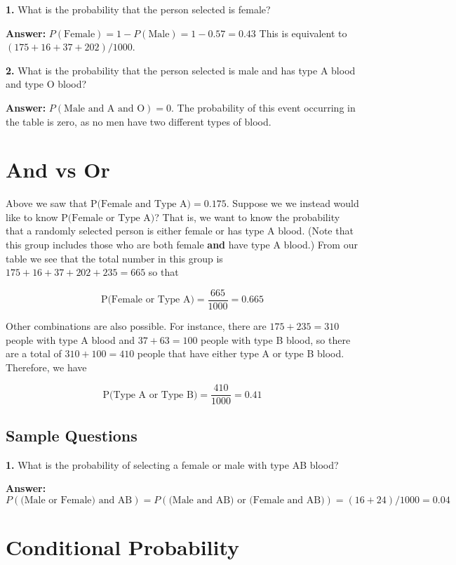 \documentclass[
]{book}
\begin{document}
\textbf{1.} What is the probability that the person selected is female?

\textbf{Answer:} \(P(\text{Female}) = 1 - P(\text{Male}) = 1 - 0.57 = 0.43\) This is equivalent to \((175 + 16 + 37 + 202) / 1000\).

\textbf{2.} What is the probability that the person selected is male and has type A blood and type O blood?

\textbf{Answer:} \(P(\text{Male and A and O}) = 0\). The probability of this event occurring in the table is zero, as no men have two different types of blood.

\hypertarget{and-vs-or}{%
\section{And vs Or}\label{and-vs-or}}

Above we saw that \(\mbox{P(Female and Type A)} = 0.175\). Suppose we
we instead would like to know \(\mbox{P(Female or Type A)}\)? That is,
we want to know the probability that a randomly selected person
is either female or has type A blood. (Note that this group includes those
who are both female \textbf{and} have type A blood.) From our table we see that
the total number in this group is \(175+16+37+202+235 = 665\) so that

\[
\mbox{P(Female or Type A)} = \frac{665}{1000} = 0.665
\]

Other combinations are also possible. For instance, there
are \(175 + 235 = 310\) people with type A blood and
\(37 + 63 = 100\) people with type B blood, so there are a total of
\(310 + 100 = 410\) people that have either type A or type B blood. Therefore, we
have

\[
\mbox{P(Type A or Type B)} = \frac{410}{1000} = 0.41
\]

\hypertarget{sample-questions-1}{%
\subsection{Sample Questions}\label{sample-questions-1}}

\textbf{1.} What is the probability of selecting a female or male with type AB blood?

\textbf{Answer:} \(P(\text{(Male or Female) and AB}) = P(\text{(Male and AB) or (Female and AB)}) = (16 + 24) / 1000 = 0.04\)

\hypertarget{conditional-probability}{%
\section{Conditional Probability}\label{conditional-probability}}
\end{document}
